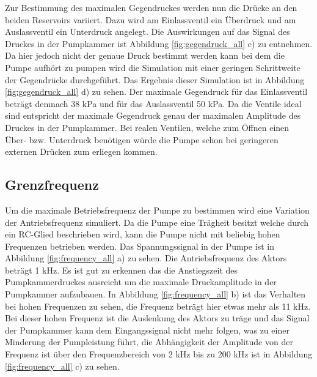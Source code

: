 \documentclass[fontsize=12pt, a4paper]{scrartcl}
\begin{document}
Zur Bestimmung des maximalen Gegendruckes werden nun die Drücke an den beiden Reservoirs variiert. Dazu wird am Einlassventil ein Überdruck und am Auslassventil ein Unterdruck angelegt. Die Auswirkungen auf das Signal des Druckes in der Pumpkammer ist Abbildung \ref{fig:gegendruck_all} c) zu entnehmen. Da hier jedoch nicht der genaue Druck bestimmt werden kann bei dem die Pumpe aufhört zu pumpen wird die Simulation mit einer geringen Schrittweite der Gegendrücke durchgeführt. Das Ergebnis dieser Simulation ist in Abbildung \ref{fig:gegendruck_all} d) zu sehen. Der maximale Gegendruck für das Einlassventil beträgt demnach 38 kPa und für das Auslassventil 50 kPa. Da die Ventile ideal sind entspricht der maximale Gegendruck genau der maximalen Amplitude des Druckes in der Pumpkammer. Bei realen Ventilen, welche zum Öffnen einen Über- bzw. Unterdruck benötigen würde die Pumpe schon bei geringeren externen Drücken zum erliegen kommen.

\subsection{Grenzfrequenz}

Um die maximale Betriebsfrequenz der Pumpe zu bestimmen wird eine Variation der Antriebsfrequenz simuliert. Da die Pumpe eine Trägheit besitzt welche durch ein RC-Glied beschrieben wird, kann die Pumpe nicht mit beliebig hohen Frequenzen betrieben werden. Das Spannungssignal in der Pumpe ist in Abbildung \ref{fig:frequency_all} a) zu sehen. Die Antriebsfrequenz des Aktors beträgt 1 kHz. Es ist gut zu erkennen das die Anstiegszeit des Pumpkammerdruckes ausreicht um die maximale Druckamplitude in der Pumpkammer aufzubauen. In Abbildung \ref{fig:frequency_all} b) ist das Verhalten bei hohen Frequenzen zu sehen, die Frequenz beträgt hier etwas mehr als 11 kHz. Bei dieser hohen Frequenz ist die Auslenkung des Aktors zu träge und das Signal der Pumpkammer kann dem Eingangssignal nicht mehr folgen, was zu einer Minderung der Pumpleistung führt, die Abhängigkeit der Amplitude von der Frequenz ist über den Frequenzbereich von 2 kHz bis zu 200 kHz ist in Abbildung \ref{fig:frequency_all} c) zu sehen.
 
\end{document}
